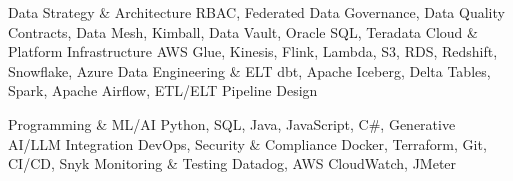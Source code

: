 

\begin{minipage}[t]{\dimexpr(\linewidth/2) - 0.5em}
  \vspace{-0.8em}
  \renewcommand{\arraystretch}{1.15}
  \begin{cvskills}
    \cvskill
      {Data Strategy \& Architecture}
      {RBAC, Federated Data Governance, Data Quality Contracts, Data Mesh, Kimball, Data Vault, Oracle SQL, Teradata}
    \cvskill
      {Cloud \& Platform Infrastructure}
      {AWS Glue, Kinesis, Flink, Lambda, S3, RDS, Redshift, Snowflake, Azure}
    \cvskill
      {Data Engineering \& ELT}
      {dbt, Apache Iceberg, Delta Tables, Spark, Apache Airflow, ETL/ELT Pipeline Design}
  \end{cvskills}
\end{minipage}
\hfill
\begin{minipage}[t]{\dimexpr(\linewidth/2) - 0.5em}
  \vspace{-0.8em}
  \renewcommand{\arraystretch}{1.15}
  \begin{cvskills}
    \cvskill
      {Programming \& ML/AI}
      {Python, SQL, Java, JavaScript, C\#, Generative AI/LLM Integration}
    \cvskill
      {DevOps, Security \& Compliance}
      {Docker, Terraform, Git, CI/CD, Snyk}
    \cvskill
      {Monitoring \& Testing}
      {Datadog, AWS CloudWatch, JMeter}
  \end{cvskills}
\end{minipage}

